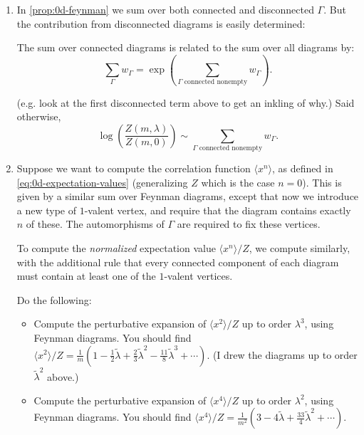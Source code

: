 \documentclass[12pt,letterpaper,reqno]{article}
\numberwithin{equation}{section}
\newcommand{\IP}[1]{\langle#1\rangle}
\newcommand{\ti}[1]{\textit{#1}}
\newcommand{\insfig}[2]{

\medskip
\noindent
\begin{minipage}{\linewidth}
\makebox[\linewidth]{\texttt{[image: figures/\#1-crop.pdf]}}
\end{minipage}
\noindent}
\begin{document}
\begin{enumerate}
\item In \autoref{prop:0d-feynman} 
we sum over both connected and disconnected $\Gamma$.
But the contribution from disconnected diagrams is easily determined:
\begin{prop} The sum over connected diagrams is related to the sum over all
diagrams by:
\begin{equation}
  \sum_{\Gamma} w_\Gamma = \exp \left( \sum_{\Gamma \text{ connected nonempty}} w_\Gamma \right).
\end{equation}
\end{prop}
(e.g. look at the first disconnected term above to get an inkling of why.)
Said otherwise,
\begin{equation}
  \log \left( \frac{Z(m,\lambda)}{Z(m,0)} \right) \sim \sum_{\Gamma \text{ connected nonempty}} w_\Gamma.
\end{equation}

\item Suppose we want to compute the correlation function $\IP{x^n}$,
as defined in \eqref{eq:0d-expectation-values} (generalizing $Z$ which is the 
case $n=0$). This is given by a similar sum over Feynman diagrams, except that
now we introduce a new type of $1$-valent vertex, and require that the diagram
contains exactly $n$ of these. The automorphisms of $\Gamma$ are required to
fix these vertices.

To compute the \ti{normalized} expectation value $\IP{x^n} / Z$, we compute
similarly, with the additional rule that every connected component of each diagram
must contain at least one of the $1$-valent vertices.
\insfig{qft-geometry-5}{0.8}

\begin{exercise} Do the following:
\begin{itemize}

\item Compute the perturbative expansion of $\IP{x^2} / Z$ up to order $\lambda^3$, using Feynman diagrams.
You should find $\IP{x^2} / Z = \frac{1}{m} (1 - \frac{1}{2} \tilde\lambda + \frac{2}{3} \tilde\lambda^2 - \frac{11}{8} \tilde\lambda^3 + \cdots )$.
(I drew the diagrams up to order $\tilde\lambda^2$ above.)

\item Compute the perturbative expansion of $\IP{x^4} / Z$ up to order $\lambda^2$, using Feynman diagrams. You should find $\IP{x^4} / Z = \frac{1}{m^2} (3 - 4 \tilde\lambda + \frac{33}{4} \tilde\lambda^2 + \cdots )$.
\end{itemize}
\end{exercise}



\end{enumerate}
\end{document}
